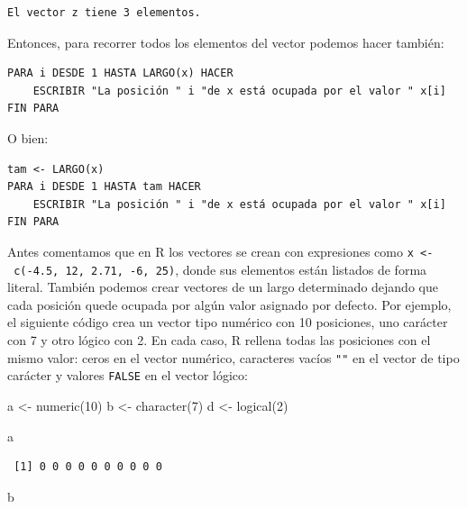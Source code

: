 \documentclass[
]{book}
\newenvironment{Shaded}{\begin{snugshade}}{\end{snugshade}}
\newcommand{\DecValTok}[1]{\textcolor[rgb]{0.00,0.00,0.81}{#1}}
\newcommand{\FunctionTok}[1]{\textcolor[rgb]{0.00,0.00,0.00}{#1}}
\newcommand{\NormalTok}[1]{#1}
\newcommand{\OtherTok}[1]{\textcolor[rgb]{0.56,0.35,0.01}{#1}}
\begin{document}
\begin{verbatim}
El vector z tiene 3 elementos.
\end{verbatim}

Entonces, para recorrer todos los elementos del vector podemos hacer también:

\begin{verbatim}
PARA i DESDE 1 HASTA LARGO(x) HACER
    ESCRIBIR "La posición " i "de x está ocupada por el valor " x[i]
FIN PARA
\end{verbatim}

O bien:

\begin{verbatim}
tam <- LARGO(x)
PARA i DESDE 1 HASTA tam HACER
    ESCRIBIR "La posición " i "de x está ocupada por el valor " x[i]
FIN PARA
\end{verbatim}

Antes comentamos que en R los vectores se crean con expresiones como \texttt{x\ \textless{}-\ c(-4.5,\ 12,\ 2.71,\ -6,\ 25)}, donde sus elementos están listados de forma literal. También podemos crear vectores de un largo determinado dejando que cada posición quede ocupada por algún valor asignado por defecto. Por ejemplo, el siguiente código crea un vector tipo numérico con 10 posiciones, uno carácter con 7 y otro lógico con 2. En cada caso, R rellena todas las posiciones con el mismo valor: ceros en el vector numérico, caracteres vacíos \texttt{""} en el vector de tipo carácter y valores \texttt{FALSE} en el vector lógico:

\begin{Shaded}
\begin{Highlighting}[]
\NormalTok{a }\OtherTok{\textless{}{-}} \FunctionTok{numeric}\NormalTok{(}\DecValTok{10}\NormalTok{)}
\NormalTok{b }\OtherTok{\textless{}{-}} \FunctionTok{character}\NormalTok{(}\DecValTok{7}\NormalTok{)}
\NormalTok{d }\OtherTok{\textless{}{-}} \FunctionTok{logical}\NormalTok{(}\DecValTok{2}\NormalTok{)}

\NormalTok{a}
\end{Highlighting}
\end{Shaded}

\begin{verbatim}
 [1] 0 0 0 0 0 0 0 0 0 0
\end{verbatim}

\begin{Shaded}
\begin{Highlighting}[]
\NormalTok{b}
\end{Highlighting}
\end{Shaded}
\end{document}
